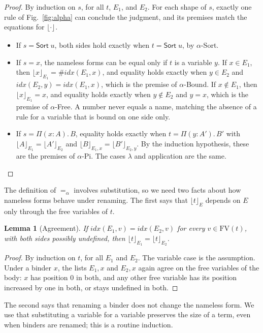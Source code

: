 \documentclass[acmsmall,screen,nonacm]{acmart}
\newtheorem{lemma}[theorem]{Lemma}
\newcommand{\Sort}[1]{\mathsf{Sort}\;#1}
\newcommand{\tPi}[3]{\Pi(#1{:}#2).\,#3}
\newcommand{\FV}{\mathrm{FV}}
\newcommand{\alphaeq}{=_{\alpha}}
\newcommand{\db}[2]{\lfloor #1 \rfloor_{#2}}
\begin{document}
\begin{proof}
By induction on $s$, for all $t$, $E_1$, and $E_2$.
For each shape of $s$, exactly one rule of Fig.~\ref{fig:alpha} can conclude the judgment, and its premises match the equations for $\db{\cdot}{}$.
\begin{itemize}
  \item If $s = \Sort{u}$, both sides hold exactly when $t = \Sort{u}$, by $\alpha$-Sort.
  \item If $s = x$, the nameless forms can be equal only if $t$ is a variable $y$.
    If $x \in E_1$, then $\db{x}{E_1} = \#\mathit{idx}(E_1, x)$, and equality holds exactly when $y \in E_2$ and $\mathit{idx}(E_2, y) = \mathit{idx}(E_1, x)$, which is the premise of $\alpha$-Bound.
    If $x \notin E_1$, then $\db{x}{E_1} = x$, and equality holds exactly when $y \notin E_2$ and $y = x$, which is the premise of $\alpha$-Free.
    A number never equals a name, matching the absence of a rule for a variable that is bound on one side only.
  \item If $s = \tPi{x}{A}{B}$, equality holds exactly when $t = \tPi{y}{A'}{B'}$ with $\db{A}{E_1} = \db{A'}{E_2}$ and $\db{B}{E_1, x} = \db{B'}{E_2, y}$.
    By the induction hypothesis, these are the premises of $\alpha$-Pi.
    The cases $\lambda$ and application are the same. \qedhere
\end{itemize}
\end{proof}

The definition of $\alphaeq$ involves substitution, so we need two facts about how nameless forms behave under renaming.
The first says that $\db{t}{E}$ depends on $E$ only through the free variables of $t$.

\begin{lemma}[Agreement]
\label{lem:alpha-agree}
If $\mathit{idx}(E_1, v) = \mathit{idx}(E_2, v)$ for every $v \in \FV(t)$, with both sides possibly undefined, then $\db{t}{E_1} = \db{t}{E_2}$.
\end{lemma}

\begin{proof}
By induction on $t$, for all $E_1$ and $E_2$.
The variable case is the assumption.
Under a binder $x$, the lists $E_1, x$ and $E_2, x$ again agree on the free variables of the body:
$x$ has position $0$ in both, and any other free variable has its position increased by one in both, or stays undefined in both.
\end{proof}

The second says that renaming a binder does not change the nameless form.
We use that substituting a variable for a variable preserves the size of a term, even when binders are renamed; this is a routine induction.
\end{document}
